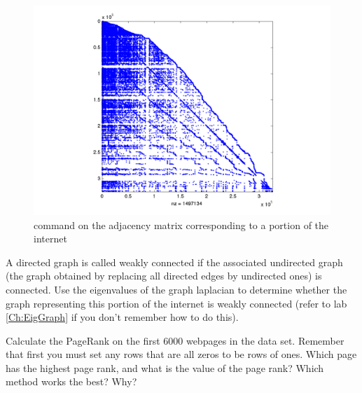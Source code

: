 \begin{figure}
\begin{center}
\includegraphics[scale = .4]{./Figures/WebSparse.pdf}
\caption{ command on the adjacency matrix corresponding to a portion of the internet}
\label{Fig:WebSparse}
\end{center}
\end{figure}

\begin{problem}
\label{prob:pg_undirected}
A directed graph is called weakly connected if the associated undirected graph (the graph obtained by replacing all directed edges by undirected ones) is connected. Use the eigenvalues of the graph laplacian to determine whether the graph representing this portion of the internet is weakly connected (refer to lab \ref{Ch:EigGraph} if you don't remember how to do this).
\end{problem}

\begin{problem}
\label{prob:pg_calc}
Calculate the PageRank on the first 6000 webpages in the data set. Remember that first you must set any rows that are all zeros to be rows of ones. Which page has the highest page rank, and what is the value of the page rank? Which method works the best? Why?
\end{problem}

